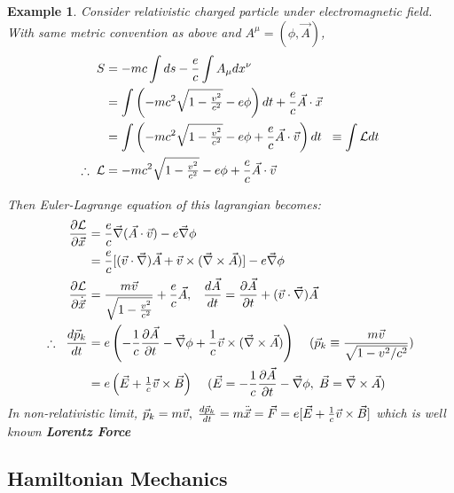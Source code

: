 \documentclass[final]{IEEEphot}
\newtheorem{example}{Example}[section]
\newcommand{\PD}[2]{\dfrac{\partial #1}{\partial #2}} %
\renewcommand{\L}{\mathcal{L}} %
\newcommand{\BKS}[1]{\left( #1 \right)} %
\newcommand{\Com}{,\hspace{0.1cm}} %
\newcommand{\hs}{\hspace{0.1cm}} %
\begin{document}
 
\begin{example}
 \normalfont
 Consider relativistic charged particle under electromagnetic field. With same metric convention as above and $A^\mu=(\phi,\vec{A})$, 
 \begin{gather}
  \begin{split}
   S&=-mc\int ds-\frac{e}{c}\int A_\mu dx^\nu \\
    &=\int \BKS{-mc^2\sqrt{1-\tfrac{v^2}{c^2}}-e\phi}dt + \frac{e}{c}\vec{A}\cdot\vec{x} \\
    &=\int \BKS{-mc^2\sqrt{1-\tfrac{v^2}{c^2}}-e\phi+\frac{e}{c}\vec{A}\cdot\vec{v}}dt \hs\hs \equiv \int \L dt \\
   \therefore \hs \L&=-mc^2\sqrt{1-\tfrac{v^2}{c^2}}-e\phi+\frac{e}{c}\vec{A}\cdot\vec{v}
  \end{split}
 \end{gather}
 
 Then Euler-Lagrange equation of this lagrangian becomes:
 \begin{gather}
  \begin{split}
   \PD{\L}{\vec{x}}&=\frac{e}{c}\vec{\nabla}(\vec{A}\cdot\vec{v})-e\vec{\nabla}\phi \\
             &=\frac{e}{c}[(\vec{v}\cdot\vec{\nabla})\vec{A}+\vec{v}\times(\vec{\nabla}\times\vec{A})]-e\vec{\nabla}\phi \\
   \PD{\L}{\dot{\vec{x}}}&=\frac{m\vec{v}}{\sqrt{1-\tfrac{v^2}{c^2}}}+\frac{e}{c}\vec{A} \Com \hs\hs \frac{d\vec{A}}{dt}=\PD{\vec{A}}{t}+(\vec{v}\cdot\vec{\nabla})\vec{A} \\
   \therefore \hs\hs \frac{d\vec{p}_k}{dt}&=e\BKS{-\frac{1}{c}\PD{\vec{A}}{t}-\vec{\nabla}\phi+\frac{1}{c}\vec{v}\times(\vec{\nabla}\times\vec{A})}\hs\hs\hs\hs (\vec{p}_k\equiv\frac{m\vec{v}}{\sqrt{1-v^2/c^2}}) \\
             &=e\BKS{\vec{E}+\tfrac{1}{c}\vec{v}\times\vec{B}} \hs\hs\hs\hs(\vec{E}=-\frac{1}{c}\PD{\vec{A}}{t}-\vec{\nabla}\phi \Com \vec{B}=\vec{\nabla}\times\vec{A})                                      
   \end{split}
 \end{gather}
In non-relativistic limit, $\vec{p}_k=m\vec{v}\Com \frac{d\vec{p}_k}{dt}=m\ddot{\vec{x}}=\vec{F}=e[\vec{E}+\frac{1}{c}\vec{v}\times\vec{B}]$ which is well known \textbf{Lorentz Force}
\end{example}

\newpage

\subsection{Hamiltonian Mechanics}
\end{document}
